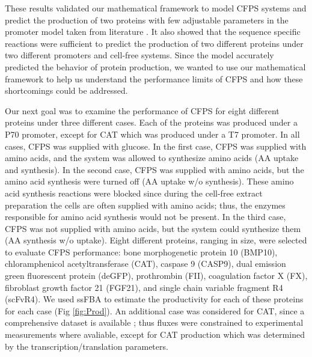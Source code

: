 \documentclass[journal=asbcd6,manuscript=article]{achemso}
\begin{document}
These results validated our mathematical framework to model CFPS systems and predict the production of two proteins with few adjustable parameters in the promoter model taken from literature \cite{Moon:2012aa}.
It also showed that the sequence specific reactions were sufficient to predict the production of two different proteins under two different promoters and cell-free systems.
Since the model accurately predicted the behavior of protein production, we wanted to use our mathematical framework to help us understand the performance limits of CFPS and how these shortcomings could be addressed.

Our next goal was to examine the performance of CFPS for eight different proteins under three different cases. 
Each of the proteins was produced under a P70 promoter, except for CAT which was produced under a T7 promoter.
In all cases, CFPS was supplied with glucose.
In the first case, CFPS was supplied with amino acids, and the system was allowed to synthesize amino acids (AA uptake and synthesis).
In the second case, CFPS was supplied with amino acids, but the amino acid synthesis were turned off (AA uptake w/o synthesis).
These amino acid synthesis reactions were blocked since during the cell-free extract preparation the cells are often supplied with amino acids; thus, the enzymes responsible for amino acid synthesis would not be present.
In the third case, CFPS was not supplied with amino acids, but the system could synthesize them (AA synthesis w/o uptake).  
Eight different proteins, ranging in size, were selected to evaluate CFPS performance: bone morphogenetic protein 10 (BMP10), chloramphenicol acetyltransferase (CAT), caspase 9 (CASP9), dual emission green fluorescent protein (deGFP), prothrombin (FII), coagulation factor X (FX), fibroblast growth factor 21 (FGF21), and single chain variable fragment R4 (scFvR4).
We used ssFBA to estimate the productivity for each of these proteins for each case (Fig \ref{fig:Prod}).
An additional case was considered for CAT, since a comprehensive dataset is available \cite{2005_calhoun_BiotechnologyProgress}; thus fluxes were constrained to experimental measurements where avaliable, except for CAT production which was determined by the transcription/translation parameters.
\end{document}

